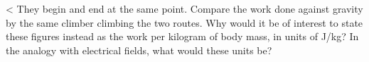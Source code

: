 <%
They begin and end at the same point. Compare the work done against gravity by the
same climber climbing the two routes. Why would it be of interest to state these
figures instead as the work per kilogram of body mass, in units of J/kg? In the analogy with electrical
fields, what would these units be?
